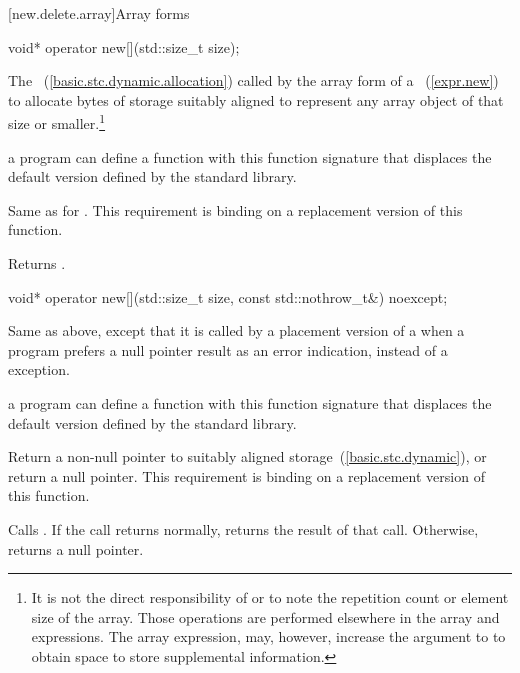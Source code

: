 [new.delete.array]{Array forms}

%
\begin{itemdecl}
void* operator new[](std::size_t size);
\end{itemdecl}

\begin{itemdescr}
\pnum
\effects
The
~(\ref{basic.stc.dynamic.allocation})
called by the array form of a
~(\ref{expr.new})
to allocate  bytes of storage suitably aligned to represent any array
object of that size or smaller.\footnote{It is not the direct responsibility of
or
to note the repetition count or element size of the array.
Those operations are performed elsewhere in the array
and
expressions.
The array
expression, may, however, increase the  argument to
to obtain space to store supplemental information.}

\pnum
\replaceable
a \Cpp program can define a
function with this function signature that displaces the default version
defined by the \Cpp standard library.

\pnum
\required
Same as for
.
This requirement is binding on a replacement version of this function.

\pnum
{}
Returns
.
\end{itemdescr}

%
\begin{itemdecl}
void* operator new[](std::size_t size, const std::nothrow_t&) noexcept;
\end{itemdecl}

\begin{itemdescr}
\pnum
\effects
Same as above, except that it is called by a placement version of a
when a \Cpp program prefers a null pointer result as an error indication,
instead of a
exception.

\pnum
\replaceable
a \Cpp program can define a
function with this function signature that displaces the default version
defined by the \Cpp standard library.

\pnum
\required
Return a non-null pointer to suitably aligned storage~(\ref{basic.stc.dynamic}),
or return a null pointer.
This requirement is binding on a replacement version of this function.

\pnum
{}
Calls . If the call returns normally,
returns the result of that call. Otherwise, returns a null pointer.
\end{itemdescr}

